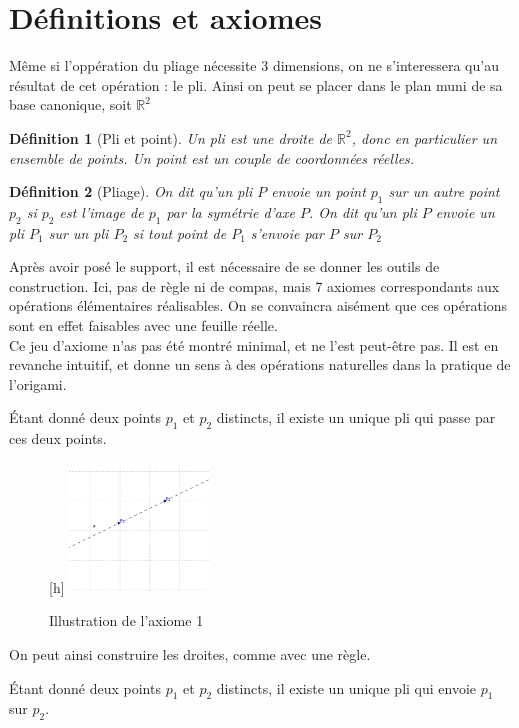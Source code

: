 \documentclass[a4paper,12pt,french]{report}
\newtheorem{definition}{Définition}[section]
\begin{document}
	\section{Définitions et axiomes}
		Même si l'oppération du pliage nécessite 3 dimensions, on ne s'interessera qu'au résultat de cet opération : le pli. Ainsi on peut se placer dans le plan muni de sa base canonique, soit $\mathbb{R}^{2}$
		\begin{definition}[Pli et point]
			Un \emph{pli} est une droite de $\mathbb{R}^{2}$, donc en particulier un ensemble de points. Un \emph{point} est un couple de coordonnées réelles.
		\end{definition}
		\begin{definition}[Pliage]
			On dit qu'un pli $P$ \emph{envoie} un point $p_{1}$ sur un autre point $p_{2}$ si $p_{2}$ est l'image de $p_{1}$ par la symétrie d'axe $P$. On dit qu'un pli $P$ \emph{envoie} un pli $P_{1}$ sur un pli $P_{2}$ si tout point de $P_{1}$ s'envoie par $P$ sur $P_{2}$
		\end{definition}
		Après avoir posé le support, il est nécessaire de se donner les outils de construction. Ici, pas de règle ni de compas, mais 7 axiomes correspondants aux opérations élémentaires réalisables. On se convaincra aisément que ces opérations sont en effet faisables avec une feuille réelle. \\
		Ce jeu d'axiome n'as pas été montré minimal, et ne l'est peut-être pas. Il est en revanche intuitif, et donne un sens à des opérations naturelles dans la pratique de l'origami. 
		\begin{axiome}
			Étant donné deux points $p_{1}$ et $p_{2}$ distincts, il existe un unique pli qui passe par ces deux points.
		\end{axiome}
		
		\begin{figure}
		    \begin{center}[h]
			\includegraphics[height=130px]{media/Ax1.eps}
		    \end{center}
			\caption{Illustration de l'axiome 1}
		\end{figure}
		
		On peut ainsi construire les droites, comme avec une règle.
		\begin{axiome}
			Étant donné deux points $p_{1}$ et $p_{2}$ distincts, il existe un unique pli qui envoie $p_{1}$ sur $p_{2}$.
		\end{axiome}
		
\end{document}
